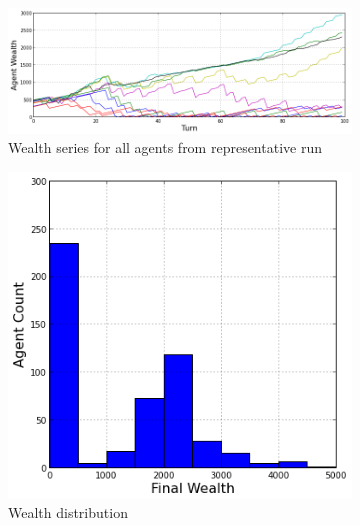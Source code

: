 \documentclass{article}
\begin{document}
\begin{figure}[h!]
	\centering
	\begin{subfigure}{\textwidth}
		\includegraphics[width=\textwidth]{Graphics/Exp4SampleRun}
		\caption{Wealth series for all agents from representative run}
	\end{subfigure}

	\begin{subfigure}{0.49\textwidth}
		\includegraphics[width=\textwidth]{Graphics/Exp4WealthDistribution}
		\caption{Wealth distribution}
	\end{subfigure}
	\begin{subfigure}{0.49\textwidth}

\end{subfigure}
\end{figure}
\end{document}
